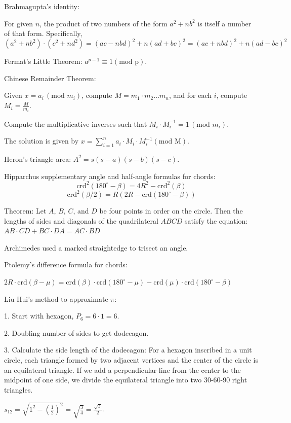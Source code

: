 \documentclass{article}
\begin{document}
Brahmagupta's identity:

For given $n$, the product of two numbers of the form $a^2 + n b^2$
is itself a number of that form. Specifically,
\[(a^2 + n b^2) \cdot (c^2 + n d^2) = (a c - n b d)^2 + n(a d + b c)^2
= (a c + n b d)^2 + n(a d - b c)^2\]

Fermat's Little Theorem: $a^{p-1} \equiv 1 (\text{mod p})$.

Chinese Remainder Theorem:

Given $x = a_i \, (\text{mod $m_i$})$,
compute $M = m_1 \cdot m_2 \dots m_n$,
and for each $i$, compute $M_i = \frac{M}{m_i}$.

Compute the multiplicative inverses such that $M_i \cdot M_i^{-1} = 1 \, (\text{mod $m_i$})$.

The solution is given by $x = \sum_{i=1}^n a_i \cdot M_i \cdot M_i^{-1} (\text{mod M})$.

Heron's triangle area: $A^2 = s(s-a)(s-b)(s-c)$.

Hipparchus supplementary angle and half-angle formulas for chords:
\[\text{crd}^2(180^\circ - \beta) = 4 R^2 - \text{crd}^2(\beta)\]
\[\text{crd}^2(\beta/2) = R(2 R - \text{crd}(180^\circ - \beta))\]

Theorem: Let $A$, $B$, $C$, and $D$ be four points in order on the circle. Then the
lengths of sides and diagonals of the quadrilateral $ABCD$ satisfy the equation:
$AB \cdot CD + BC \cdot DA = AC \cdot BD$


Archimedes used a marked straightedge to trisect an angle.



Ptolemy's difference formula for chords:

$2 R \cdot \text{crd}(\beta - \mu) = \text{crd}(\beta) \cdot \text{crd}(180^\circ - \mu) - \text{crd}(\mu) \cdot \text{crd}(180^\circ - \beta)$


Liu Hui's method to approximate $\pi$:

1. Start with hexagon, $P_6 = 6 \cdot 1 = 6$.

2. Doubling number of sides to get dodecagon.

3. Calculate the side length of the dodecagon: For a hexagon inscribed in a unit circle, each triangle formed by two adjacent vertices and the center of the circle is an equilateral triangle. If we add a perpendicular line from the center to the midpoint of one side, we divide the equilateral triangle into two 30-60-90 right triangles.

$s_{12} = \sqrt{1^2 - \left(\frac{1}{2}\right)^2} = \sqrt{\frac{3}{4}} = \frac{\sqrt{3}}{2}$.
\end{document}
